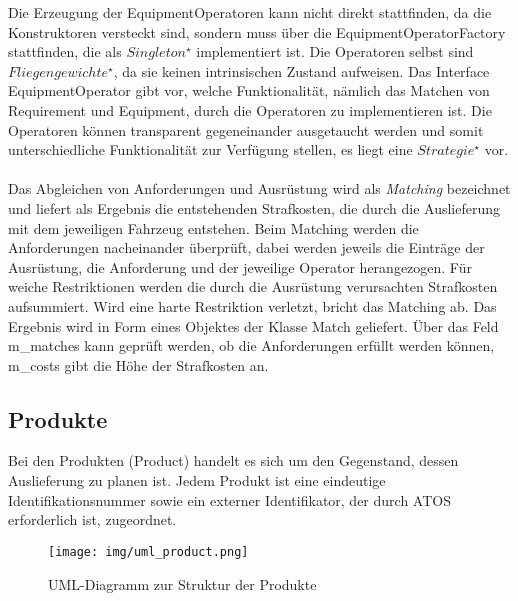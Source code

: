 \noindent
Die Erzeugung der \textsf{EquipmentOperator}en kann nicht direkt stattfinden, da die Konstruktoren versteckt sind, sondern muss über die \textsf{EquipmentOperatorFactory} stattfinden, die als $Singleton^\star$ implementiert ist. Die Operatoren selbst sind $Fliegengewichte^\star$, da sie keinen intrinsischen Zustand aufweisen. Das Interface \textsf{EquipmentOperator} gibt vor, welche Funktionalität, nämlich das Matchen von \textsf{Requirement} und \textsf{Equipment}, durch die Operatoren zu implementieren ist. Die Operatoren können transparent gegeneinander ausgetaucht werden und somit unterschiedliche Funktionalität zur Verfügung stellen, es liegt eine $Strategie^\star$ vor. \\
\\
Das Abgleichen von Anforderungen und Ausrüstung wird als \emph{Matching} bezeichnet und liefert als Ergebnis die entstehenden Strafkosten, die durch die Auslieferung mit dem jeweiligen Fahrzeug entstehen. Beim Matching werden die Anforderungen nacheinander überprüft, dabei werden jeweils die Einträge der Ausrüstung, die Anforderung und der jeweilige Operator herangezogen. Für weiche Restriktionen werden die durch die Ausrüstung verursachten Strafkosten aufsummiert. Wird eine harte Restriktion verletzt, bricht das Matching ab. Das Ergebnis wird in Form eines Objektes der Klasse \textsf{Match} geliefert. Über das Feld \textsf{m\_matches} kann geprüft werden, ob die Anforderungen erfüllt werden können, \textsf{m\_costs} gibt die Höhe der Strafkosten an.


\subsection{Produkte}
Bei den Produkten (\textsf{Product}) handelt es sich um den Gegenstand, dessen Auslieferung zu planen ist. Jedem Produkt ist eine eindeutige Identifikationsnummer sowie ein externer Identifikator, der durch \textsc{ATOS} erforderlich ist, zugeordnet. \\
\begin{wrapfigure}{r}{0.35\textwidth}
  \vspace{-20pt}
  \begin{center}
    \texttt{[image: img/uml\_product.png]}
  \end{center}
  \vspace{-20pt}
  \caption{UML-Diagramm zur Struktur der Produkte}
  \vspace{-10pt}
  \label{fig:uml_product}
\end{wrapfigure}

